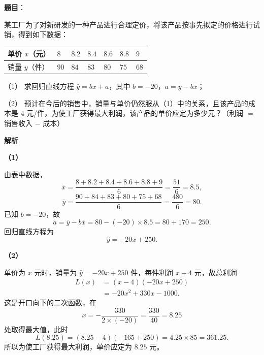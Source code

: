 \begin{answer}

\textbf{题目}：

某工厂为了对新研发的一种产品进行合理定价，将该产品按事先拟定的价格进行试销，得到如下数据：

\begin{center}
\begin{tabular}{lllllll}
\toprule
单价 $x$（元） & $8$ & $8.2$ & $8.4$ & $8.6$ & $8.8$ & $9$ \\
\midrule
销量 $y$（件） & $90$ & $84$ & $83$ & $80$ & $75$ & $68$ \\
\bottomrule
\end{tabular}
\end{center}

（1） 求回归直线方程 $\hat y=bx+a$，其中 $b=-20$，$a=\bar y-b\bar x$；

（2） 预计在今后的销售中，销量与单价仍然服从（1）中的关系，且该产品的成本是 $4$ 元/件，为使工厂获得最大利润，该产品的单价应定为多少元？（利润 $=$ 销售收入 $-$ 成本）

\textbf{解析}

\textbf{（1）}

由表中数据，
\nopagebreak[4]
\[\bar x=\frac{8+8.2+8.4+8.6+8.8+9}{6}=\frac{51}{6}=8.5,\]
\nopagebreak[4]
\[\bar y=\frac{90+84+83+80+75+68}{6}=\frac{480}{6}=80.\]
已知 $b=-20$，故
\nopagebreak[4]
\[a=\bar y-b\bar x=80-(-20)\times8.5=80+170=250.\]
回归直线方程为
\nopagebreak[4]
\[\hat y=-20x+250.\]

\textbf{（2）}

单价为 $x$ 元时，销量为 $\hat y=-20x+250$ 件，每件利润 $x-4$ 元，故总利润
\nopagebreak[4]
\[\begin{aligned}
L(x)&=(x-4)(-20x+250)\\
&=-20x^2+330x-1000.
\end{aligned}\]
这是开口向下的二次函数，在
\nopagebreak[4]
\[x=-\frac{330}{2\times(-20)}=\frac{330}{40}=8.25\]
处取得最大值，此时
\nopagebreak[4]
\[L(8.25)=(8.25-4)(-165+250)=4.25\times85=361.25.\]
所以为使工厂获得最大利润，单价应定为 $8.25$ 元。



\end{answer}
